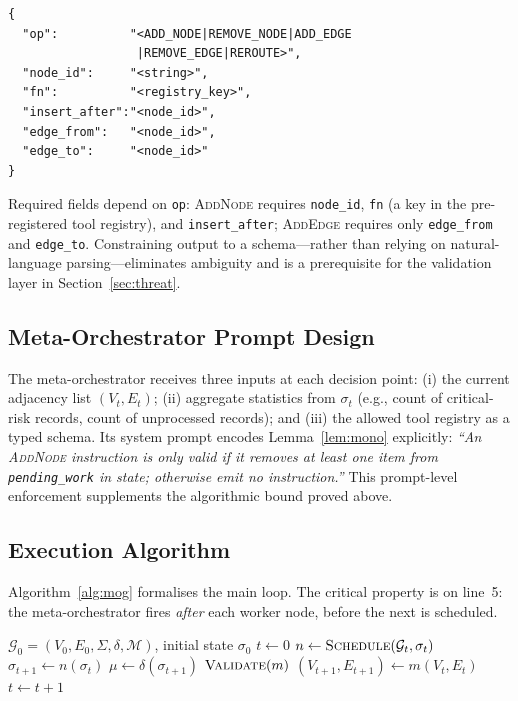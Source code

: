 \documentclass[conference]{IEEEtran}
\begin{document}
\begin{verbatim}
{
  "op":          "<ADD_NODE|REMOVE_NODE|ADD_EDGE
                  |REMOVE_EDGE|REROUTE>",
  "node_id":     "<string>",
  "fn":          "<registry_key>",
  "insert_after":"<node_id>",
  "edge_from":   "<node_id>",
  "edge_to":     "<node_id>"
}
\end{verbatim}

Required fields depend on \texttt{op}: \textsc{AddNode} requires
\texttt{node\_id}, \texttt{fn} (a key in the pre-registered tool
registry), and \texttt{insert\_after}; \textsc{AddEdge} requires only
\texttt{edge\_from} and \texttt{edge\_to}. Constraining output to a
schema---rather than relying on natural-language parsing---eliminates
ambiguity and is a prerequisite for the validation layer in
Section~\ref{sec:threat}.

\subsection{Meta-Orchestrator Prompt Design}
The meta-orchestrator receives three inputs at each decision point:
(i) the current adjacency list $(V_t, E_t)$; (ii) aggregate statistics
from $\sigma_t$ (e.g., count of critical-risk records, count of
unprocessed records); and (iii) the allowed tool registry as a typed
schema. Its system prompt encodes Lemma~\ref{lem:mono} explicitly:
\emph{``An \textsc{AddNode} instruction is only valid if it removes at
least one item from \texttt{pending\_work} in state; otherwise emit
no instruction.''} This prompt-level enforcement supplements the
algorithmic bound proved above.

\subsection{Execution Algorithm}

Algorithm~\ref{alg:mog} formalises the main loop. The critical
property is on line~5: the meta-orchestrator fires \emph{after} each
worker node, before the next is scheduled.

\begin{algorithm}[t]
  \caption{MOG Execution Loop}
  \label{alg:mog}
  \begin{algorithmic}[1]
    \REQUIRE $\mathcal{G}_0=(V_0,E_0,\Sigma,\delta,\mathcal{M})$,\;
             initial state $\sigma_0$
    \STATE $t \gets 0$
      \STATE $n \gets \textsc{Schedule}(\mathcal{G}_t, \sigma_t)$
      \STATE $\sigma_{t+1} \gets n(\sigma_t)$
      \STATE $\mu \gets \delta(\sigma_{t+1})$
        \STATE $\textsc{Validate}(m)$
        \STATE $(V_{t+1},E_{t+1}) \gets m(V_t,E_t)$
      \ENDFOR
      \STATE $t \gets t+1$
    \ENDWHILE
  \end{algorithmic}
\end{algorithm}
\end{document}
